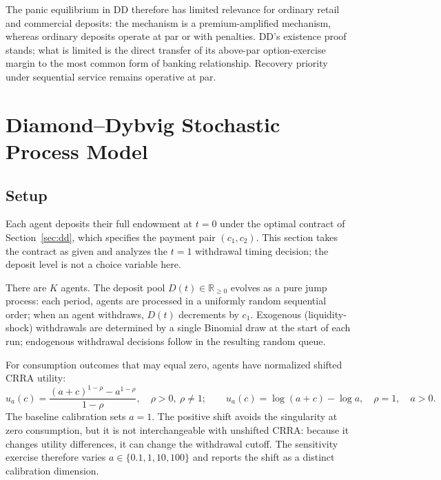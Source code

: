 \documentclass[12pt]{article}\usepackage[]{graphicx}\usepackage[]{xcolor}
\begin{document}
The panic equilibrium in DD therefore has limited relevance for ordinary retail and commercial deposits: the mechanism is a premium-amplified mechanism, whereas ordinary deposits operate at par or with penalties.
DD's existence proof stands; what is limited is the direct transfer of its above-par option-exercise margin to the most common form of banking relationship.
Recovery priority under sequential service remains operative at par.

\section{Diamond--Dybvig Stochastic Process Model}
\label{sec:process}

\subsection{Setup}

Each agent deposits their full endowment at $t=0$ under the optimal contract of Section~\ref{sec:dd}, which specifies the payment pair $(c_1, c_2)$.
This section takes the contract as given and analyzes the $t=1$ withdrawal timing decision; the deposit level is not a choice variable here.

There are $K$ agents.
The deposit pool $D(t) \in \mathbb{R}_{\geq 0}$ evolves as a pure jump process: each period, agents are processed in a uniformly random sequential order; when an agent withdraws, $D(t)$ decrements by $c_1$.
Exogenous (liquidity-shock) withdrawals are determined by a single Binomial draw at the start of each run; endogenous withdrawal decisions follow in the resulting random queue.

For consumption outcomes that may equal zero, agents have normalized shifted CRRA utility:
%
\begin{equation}
  u_a(c) =
  \frac{(a+c)^{1-\rho}-a^{1-\rho}}{1-\rho},
  \quad \rho > 0,\ \rho \neq 1;
  \qquad
  u_a(c) = \log(a+c)-\log a,\quad \rho=1,
  \quad a>0.
  \label{eq:crra}
\end{equation}
%
The baseline calibration sets $a=1$.
The positive shift avoids the singularity at zero consumption, but it is not interchangeable with unshifted CRRA: because it changes utility differences, it can change the withdrawal cutoff.
The sensitivity exercise therefore varies $a\in\{0.1,1,10,100\}$ and reports the shift as a distinct calibration dimension.
\end{document}
